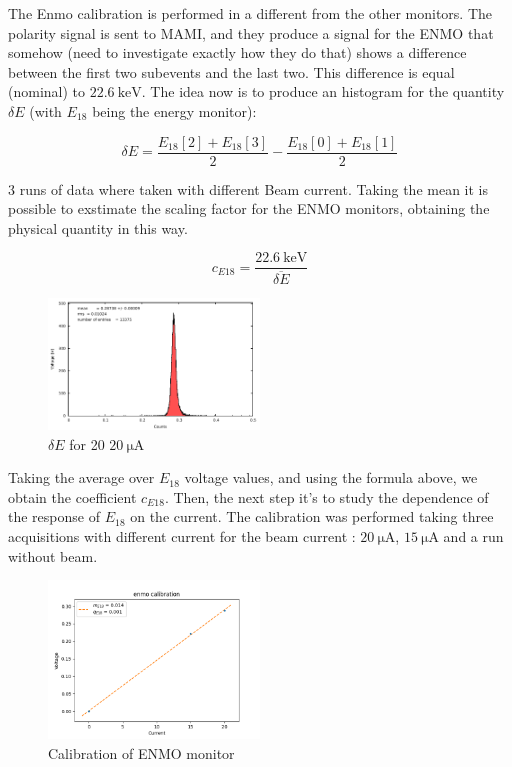 The Enmo calibration is performed in a different from the other monitors. The polarity signal is sent to MAMI, and they produce a signal for the ENMO that somehow (need to investigate exactly how they do that) shows a difference between the first two subevents and the last two. This difference is equal (nominal) to $\SI{22.6}{\kilo \electronvolt}$. The idea now is to produce an histogram for the quantity $\delta E$ (with $E_{18}$ being the energy monitor):

\begin{equation*}
\delta E = \frac{E_{18}[2] + E_{18}[3]}{2} - \frac{E_{18}[0] + E_{18}[1]}{2} 
\end{equation*}

3 runs of data where taken with different Beam current. Taking the mean it is possible to exstimate the scaling factor for the ENMO monitors, obtaining the physical quantity in this way.

\begin{equation*}
c_{E18} = \frac{\SI{22.6}{\kilo \electronvolt}}{\overline{\delta E}}
\end{equation*}

\begin{figure}[hbtp]
\centering
\includegraphics[width = 0.5\textwidth]{Analysis/Enmo_Calibration.pdf}
\caption{$\delta E$ for 20 $\SI{20}{\micro \ampere}$}
\end{figure}

Taking the average over $E_{18}$ voltage values, and using the formula above, we obtain the coefficient $c_{E18}$.
Then, the next step it's to study the dependence of the response of $E_{18}$ on the current.
The calibration was performed taking three acquisitions with different current for the beam current : $\SI{20}{\micro \ampere}$, $\SI{15}{\micro \ampere}$ and a run without beam. 

\begin{figure}[hbtp]
\centering
\includegraphics[width = 0.5\textwidth]{Analysis/E18_Calibration.png}
\caption{Calibration of ENMO monitor}
\end{figure}

